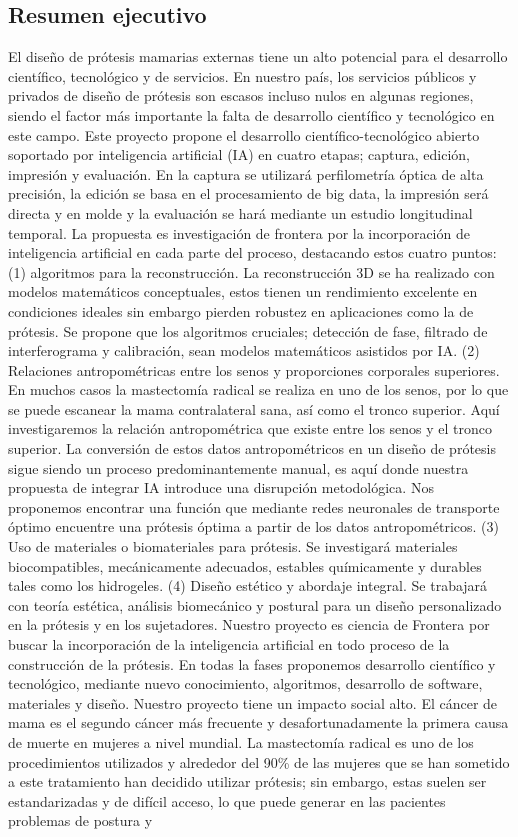 \documentclass[12pt,a4paper]{article}
\begin{document}
\subsection{Resumen ejecutivo}
El diseño de prótesis mamarias externas tiene un alto potencial para el desarrollo científico, tecnológico y de servicios. En nuestro país, los servicios públicos y privados de diseño de prótesis son escasos incluso nulos en algunas regiones, siendo el factor más importante la falta de desarrollo científico y tecnológico en este campo. Este proyecto propone el desarrollo científico-tecnológico abierto soportado por inteligencia artificial (IA) en cuatro etapas; captura, edición, impresión y evaluación. En la captura se utilizará perfilometría óptica de alta precisión, la edición se basa en el procesamiento de big data, la impresión será directa y en molde y la evaluación se hará mediante un estudio longitudinal temporal.  La propuesta es investigación de frontera por la incorporación de inteligencia artificial en cada parte del proceso, destacando estos cuatro puntos: (1) algoritmos para la reconstrucción. La reconstrucción 3D se ha realizado con modelos matemáticos conceptuales, estos tienen un rendimiento excelente en condiciones ideales sin embargo pierden robustez en aplicaciones como la de prótesis. Se propone que los algoritmos cruciales; detección de fase, filtrado de interferograma y calibración, sean modelos matemáticos asistidos por IA. (2) Relaciones antropométricas entre los senos y proporciones corporales superiores. En muchos casos la mastectomía radical se realiza en uno de los senos, por lo que se puede escanear la mama contralateral sana, así como el tronco superior. Aquí investigaremos la relación antropométrica que existe entre los senos y el tronco superior. La conversión de estos datos antropométricos en un diseño de prótesis sigue siendo un proceso predominantemente manual, es aquí donde nuestra propuesta de integrar IA introduce una disrupción metodológica. Nos proponemos encontrar una función que mediante redes neuronales de transporte óptimo encuentre una prótesis óptima a partir de los datos antropométricos. (3) Uso de materiales o biomateriales para prótesis. Se investigará materiales biocompatibles, mecánicamente adecuados, estables químicamente y durables tales como los hidrogeles. (4) Diseño estético y abordaje integral. Se trabajará con teoría estética, análisis biomecánico y postural para un diseño personalizado en la prótesis y en los sujetadores. Nuestro proyecto es ciencia de Frontera por buscar la incorporación de la inteligencia artificial en todo proceso de la construcción de la prótesis. En todas la fases proponemos desarrollo científico y tecnológico, mediante nuevo conocimiento, algoritmos, desarrollo de software, materiales y diseño. Nuestro proyecto tiene un impacto social alto. El cáncer de mama es el segundo cáncer más frecuente y desafortunadamente la primera causa de muerte en mujeres a nivel mundial. La mastectomía radical es uno de los procedimientos utilizados y alrededor del 90\% de las mujeres que se han sometido a este tratamiento han decidido utilizar prótesis; sin embargo, estas suelen ser estandarizadas y de difícil acceso, lo que puede generar en las pacientes problemas de postura y 
\end{document}
